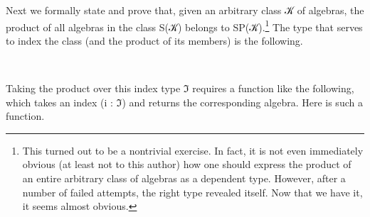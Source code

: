 \documentclass[a4paper,UKenglish,cleveref,autoref,thm-restate]{lipics-v2021}
\begin{document}
Next we formally state and prove that, given an arbitrary class \ab 𝒦 of algebras, the product of all algebras in the class \ad S(\ab 𝒦) belongs to \ad S\ad P(\ab 𝒦).\footnote{This turned out to be a nontrivial exercise. In fact, it is not even immediately obvious (at least not to this author) how one should express the product of an entire arbitrary class of algebras as a dependent type. However, after a number of failed attempts, the right type revealed itself. Now that we have it, it seems almost obvious.}
The type that serves to index the class (and the product of its members) is the following.
\ccpad
\begin{code}%
\>[1]\AgdaSpace{}%
\AgdaSymbol{:}\AgdaSpace{}%
\AgdaSymbol{\{}\AgdaSpace{}%
\AgdaSymbol{:}\AgdaSpace{}%
\AgdaSymbol{\}}\AgdaSpace{}%
%
\>[23]\AgdaSpace{}%
\AgdaSymbol{(}\AgdaSpace{}%
\AgdaSpace{}%
\AgdaSymbol{)(}\AgdaSpace{}%
\AgdaSymbol{)}\AgdaSpace{}%
\AgdaSpace{}%
\AgdaSymbol{(}\AgdaSpace{}%
\AgdaSymbol{)}\AgdaSpace{}%
\<%
\\
%
\>[1]\AgdaSpace{}%
\AgdaSymbol{\{}\AgdaSymbol{\}}\AgdaSpace{}%
\AgdaSpace{}%
\AgdaSymbol{=}\AgdaSpace{}%
\AgdaSpace{}%
\AgdaSpace{}%
\AgdaSpace{}%
\AgdaSymbol{(}\AgdaSpace{}%
\AgdaSpace{}%
\AgdaSymbol{)}\AgdaSpace{}%
\AgdaFunction{,}\AgdaSpace{}%
\AgdaSpace{}%
\AgdaSpace{}%
\<%
\end{code}
\ccpad
Taking the product over this index type \af ℑ requires a function like the following, which takes an index (i : ℑ) and returns the corresponding algebra. Here is such a function.
\ccpad
\end{document}
